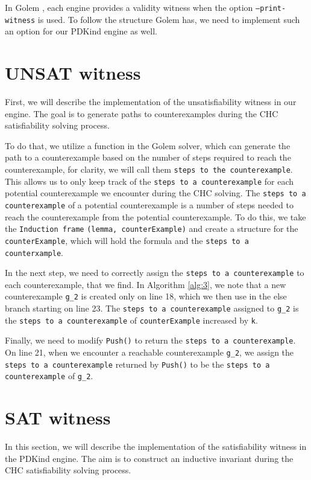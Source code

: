 In Golem \cite{blicha_golem_2023}, each engine provides a validity witness when the option \texttt{--print-witness} is used. To follow the structure Golem has, we need to implement such an option for our PDKind engine as well.

\section*{UNSAT witness} \label{UNSATWit}
\noindent First, we will describe the implementation of the unsatisfiability witness in our engine. The goal is to generate paths to counterexamples during the CHC satisfiability solving process.

To do that, we utilize a function in the Golem solver, which can generate the path to a counterexample based on the number of steps required to reach the counterexample, for clarity, we will call them \texttt{steps to the counterexample}. This allows us to only keep track of the \texttt{steps to a counterexample} for each potential counterexample we encounter during the CHC solving. The \texttt{steps to a counterexample} of a potential counterexample is a number of steps needed to reach the counterexample from the potential counterexample. To do this, we take the \texttt{Induction frame} \texttt{(lemma, counterExample)} and create a structure for the \texttt{counterExample}, which will hold the formula and the \texttt{steps to a counterxample}.

In the next step, we need to correctly assign the \texttt{steps to a counterexample} to each counterexample, that we find. In Algorithm \ref{alg:3}, we note that a new counterexample \texttt{g\_2} is created only on line 18, which we then use in the else branch starting on line 23. The \texttt{steps to a counterexample} assigned to \texttt{g\_2} is the \texttt{steps to a counterexample} of \texttt{counterExample} increased by \texttt{k}.

Finally, we need to modify \texttt{Push()} to return the \texttt{steps to a counterexample}. On line 21, when we encounter a reachable counterexample \texttt{g\_2}, we assign the \texttt{steps to a counterexample} returned by \texttt{Push()} to be the \texttt{steps to a counterexample} of \texttt{g\_2}.

\section*{SAT witness}
\noindent In this section, we will describe the implementation of the satisfiability witness in the PDKind engine. The aim is to construct an inductive invariant during the CHC satisfiability solving process.

